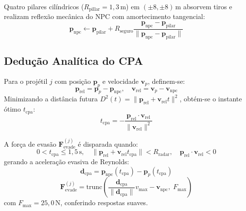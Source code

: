 \documentclass[10pt,conference,twocolumn]{article}
\begin{document}
Quatro pilares cilíndricos ($R_{\text{pillar}} = 1{,}3\,\text{m}$) em $(\pm 8, \pm 8)\,\text{m}$ absorvem tiros e realizam reflexão mecânica do NPC com amortecimento tangencial:
\begin{equation}
\mathbf{p}_{\text{npc}} \leftarrow \mathbf{p}_{\text{pilar}} + R_{\text{seguro}} \frac{\mathbf{p}_{\text{npc}} - \mathbf{p}_{\text{pilar}}}{\|\mathbf{p}_{\text{npc}} - \mathbf{p}_{\text{pilar}}\|}
\end{equation}

\subsection{Dedução Analítica do CPA}
Para o projétil $j$ com posição $\mathbf{p}_p$ e velocidade $\mathbf{v}_p$, definem-se:
\begin{equation}
\mathbf{p}_{\text{rel}} = \mathbf{p}_p - \mathbf{p}_{\text{npc}}, \quad \mathbf{v}_{\text{rel}} = \mathbf{v}_p - \mathbf{v}_{\text{npc}}
\end{equation}
Minimizando a distância futura $D^2(t) = \|\mathbf{p}_{\text{rel}} + \mathbf{v}_{\text{rel}} t\|^2$, obtém-se o instante ótimo $t_{\text{cpa}}$:
\begin{equation}
t_{\text{cpa}} = -\frac{\mathbf{p}_{\text{rel}} \cdot \mathbf{v}_{\text{rel}}}{\|\mathbf{v}_{\text{rel}}\|^2} \label{eq:tcpa}
\end{equation}

A força de evasão $\mathbf{F}_{\text{evade}}^{(j)}$ é disparada quando:
\begin{equation}
0 < t_{\text{cpa}} \le 1{,}5\,\text{s}, \quad \|\mathbf{p}_{\text{rel}} + \mathbf{v}_{\text{rel}} t_{\text{cpa}}\| < R_{\text{radar}}, \quad \mathbf{p}_{\text{rel}} \cdot \mathbf{v}_{\text{rel}} < 0
\end{equation}
gerando a aceleração evasiva de Reynolds:
\begin{equation}
\mathbf{d}_{\text{cpa}} = \mathbf{p}_{\text{npc}}(t_{\text{cpa}}) - \mathbf{p}_p(t_{\text{cpa}})
\end{equation}
\begin{equation}
\mathbf{F}_{\text{evade}}^{(j)} = \text{trunc}\left(\frac{\mathbf{d}_{\text{cpa}}}{\|\mathbf{d}_{\text{cpa}}\|} v_{\text{max}} - \mathbf{v}_{\text{npc}}, \; F_{\text{max}}\right) \label{eq:reynolds_steer}
\end{equation}
com $F_{\text{max}} = 25{,}0\,\text{N}$, conferindo respostas suaves.
\end{document}
